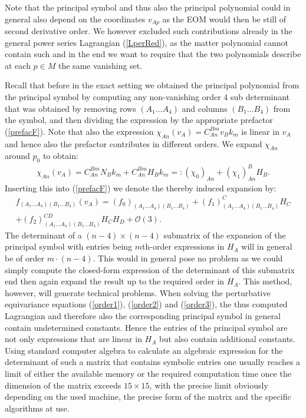 %
%
%
%
%
%
%
Note that the principal symbol and thus also the principal polynomial could in general also depend on the coordinates $v_{Ap}$ as the EOM would then be still of second derivative order. We however excluded such contributions already in the general power series Lagrangian (\ref{LperRed}),  as the matter polynomial cannot contain such and in the end we want to require that the two polynomials describe at each $p \in M$ the same vanishing set. 

Recall that before in the exact setting we obtained the principal polynomial from the principal symbol by computing any non-vanishing order $4$ sub determinant that was obtained by removing rows $(A_1...A_4)$ and columns $(B_1...B_4)$ from the symbol, and then dividing the expression by the appropriate prefactor (\ref{prefacF}).
Note that also the expression $\chi_{An}(v_A) = C_{An}^{Bm}v_Bk_m$ is linear in $v_A$ and hence also the prefactor contributes in different orders. We expand $\chi_{An}$ around $p_0$ to obtain:
\begin{align}
\chi_{An}(v_A) =  C^{Bm}_{An} N_B k_m + C^{Bm}_{An} H_B k_m =: (\chi_0)_{An} + (\chi_1)^B_{An}H_B.
\end{align}
Inserting this into (\ref{prefacF}) we denote the thereby induced expansion by:
\begin{multline}\label{prefacExp}
    f_{(A_1...A_4)(B_1...B_4)}(v_A) = (f_0)_{(A_1...A_4)(B_1...B_4)} + (f_1)^C_{(A_1...A_4)(B_1...B_4)}H_C\\ + (f_2)^{CD}_{(A_1...A_4)(B_1...B_4)}H_CH_D
    + \mathcal{O}(3).
\end{multline}
The determinant of a $(n-4) \times (n-4)$ submatrix of the expansion of the principal symbol with entries being $m$th-order expressions in $H_A$ will in general be of order $m\cdot(n-4)$. This would in general pose no problem as we could simply compute the closed-form expression of the determinant of this submatrix end then again expand the result up to the required order in $H_A$. This method, however, will generate technical problems. When solving the perturbative equivariance equations (\ref{order1}), (\ref{order2}) and (\ref{order3}), the thus computed Lagrangian and therefore also the corresponding principal symbol in general contain undetermined constants. Hence the entries of the principal symbol are not only expressions that are linear in $H_A$ but also contain additional constants. Using standard computer algebra to calculate an algebraic expression for the determinant of such a matrix that contains symbolic entries one usually reaches a limit of either the available memory or the required computation time once the dimension of the matrix exceeds $15 \times 15$, with the precise limit obviously depending on the used machine, the precise form of the matrix and the specific algorithms at use. 

